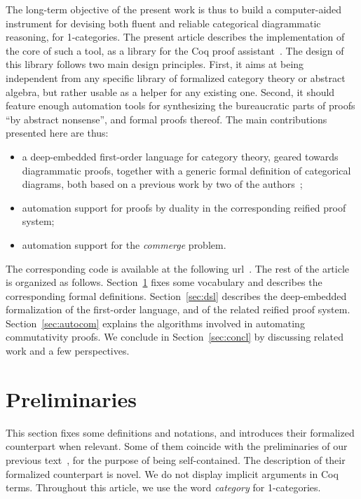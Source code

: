 \documentclass[10pt,a4paper]{article}
\newcommand{\namefont}[1]{\textsf{#1}}
\newcommand{\Coq}{\namefont{Coq}\xspace}
\renewcommand{\~}{\widetilde}
\begin{document}
The long-term objective of the present work is thus to build a computer-aided instrument for devising both fluent and reliable categorical diagrammatic reasoning, for 1-categories. The present article describes the implementation of the core of such a tool, as a library for the \Coq{} proof assistant~\cite{the_coq_development_team_2023_8161141}. The design of this library follows two main design principles. First, it aims at being independent from any specific library of formalized category theory or abstract algebra, but rather usable as a helper for any existing one. Second, it should feature enough automation tools for synthesizing the bureaucratic parts of proofs \enquote{by abstract nonsense}, and formal proofs thereof. The main contributions presented here are thus:
\begin{itemize}
  \item a deep-embedded first-order language for category theory, geared towards diagrammatic proofs, together with a generic formal definition of categorical diagrams, both based on a previous work by two of the authors~\cite{DBLP:conf/csl/MahboubiP24};
  \item automation support for proofs by duality in the corresponding reified proof system;
  \item automation support for the \emph{commerge} problem.
\end{itemize}
The corresponding code is available at the following url~\cite{repo}. The rest of the article is organized as follows. Section~\ref{sec:prelim} fixes some vocabulary and describes the corresponding formal definitions. Section~\ref{sec:dsl} describes the deep-embedded formalization of the first-order language, and of the related reified proof system. Section~\ref{sec:autocom} explains the algorithms involved in automating commutativity proofs. We conclude in Section~\ref{sec:concl} by discussing related work and a few perspectives.





\section{Preliminaries}\label{sec:prelim}

This section fixes some definitions and notations, and introduces their formalized counterpart when relevant. Some of them coincide with the preliminaries of our previous text~\cite{DBLP:conf/csl/MahboubiP24}, for the purpose of being self-contained. The description of their formalized counterpart is novel. We do not display implicit arguments in \Coq{} terms. Throughout this article, we use the word \emph{category} for 1-categories.
\end{document}
